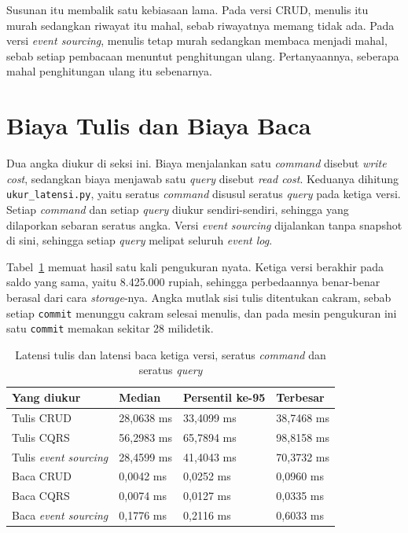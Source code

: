Susunan itu membalik satu kebiasaan lama. Pada versi CRUD, menulis itu murah
sedangkan riwayat itu mahal, sebab riwayatnya memang tidak ada. Pada versi
\textit{event sourcing}, menulis tetap murah sedangkan membaca menjadi mahal,
sebab setiap pembacaan menuntut penghitungan ulang. Pertanyaannya, seberapa
mahal penghitungan ulang itu sebenarnya.

\section{Biaya Tulis dan Biaya Baca}

Dua angka diukur di seksi ini. Biaya menjalankan satu \textit{command} disebut
\textit{write cost}, sedangkan biaya menjawab satu
\textit{query} disebut
\textit{read cost}. Keduanya dihitung
\texttt{ukur\_latensi.py}, yaitu seratus
\textit{command} disusul seratus \textit{query} pada ketiga versi. Setiap \textit{command} dan setiap
\textit{query} diukur sendiri-sendiri, sehingga yang dilaporkan sebaran seratus angka.
Versi \textit{event sourcing} dijalankan tanpa snapshot di sini,
sehingga
setiap \textit{query} melipat seluruh \textit{event log}.

Tabel~\ref{tab:latensi-cqrs} memuat hasil satu kali pengukuran nyata. Ketiga versi
berakhir pada saldo yang sama, yaitu 8.425.000 rupiah, sehingga perbedaannya
benar-benar berasal dari cara \textit{storage}-nya. Angka mutlak sisi tulis
ditentukan cakram, sebab setiap \texttt{commit} menunggu cakram selesai menulis,
dan pada mesin pengukuran ini satu \texttt{commit} memakan sekitar 28
milidetik.

\begin{table}[htbp]
  \centering
  \caption{Latensi tulis dan latensi baca ketiga versi, seratus \textit{command} dan
    seratus \textit{query}}
  \label{tab:latensi-cqrs}
  \begin{tabularx}{\textwidth}{|X|l|l|l|}
    \hline
    \textbf{Yang diukur} & \textbf{Median} & \textbf{Persentil ke-95} & \textbf{Terbesar} \\
    \hline
    Tulis CRUD & 28,0638 ms & 33,4099 ms & 38,7468 ms \\
    \hline
    Tulis CQRS & 56,2983 ms & 65,7894 ms & 98,8158 ms \\
    \hline
    Tulis \textit{event sourcing} & 28,4599 ms & 41,4043 ms & 70,3732 ms \\
    \hline
    Baca CRUD & 0,0042 ms & 0,0252 ms & 0,0960 ms \\
    \hline
    Baca CQRS & 0,0074 ms & 0,0127 ms & 0,0335 ms \\
    \hline
    Baca \textit{event sourcing} & 0,1776 ms & 0,2116 ms & 0,6033 ms \\
    \hline
  \end{tabularx}
\end{table}

